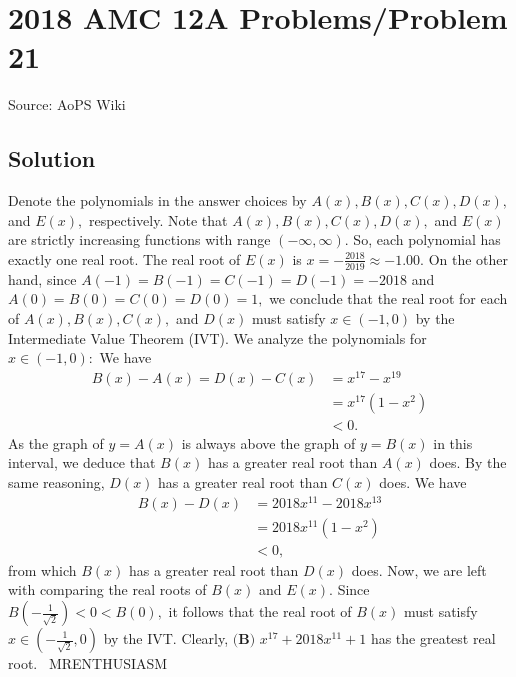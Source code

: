 \documentclass[12pt]{article}
\begin{document}
\section*{{2018 AMC 12A Problems/Problem 21}}
Source: AoPS Wiki

\subsection*{Solution}
Denote the polynomials in the answer choices by $A(x),B(x),C(x),D(x),$ and $E(x),$ respectively. Note that $A(x),B(x),C(x),D(x),$ and $E(x)$ are strictly increasing functions with range $(-\infty,\infty).$ So, each polynomial has exactly one real root. The real root of $E(x)$ is $x=-\frac{2018}{2019}\approx-1.00.$ On the other hand, since $A(-1)=B(-1)=C(-1)=D(-1)=-2018$ and $A(0)=B(0)=C(0)=D(0)=1,$ we conclude that the real root for each of $A(x),B(x),C(x),$ and $D(x)$ must satisfy $x\in(-1,0)$ by the Intermediate Value Theorem (IVT). We analyze the polynomials for $x\in(-1,0):$ We have \begin{align*} B(x)-A(x)=D(x)-C(x)&=x^{17}-x^{19} \\ &=x^{17}\left(1-x^2\right) \\ &<0. \end{align*} As the graph of $y=A(x)$ is always above the graph of $y=B(x)$ in this interval, we deduce that $B(x)$ has a greater real root than $A(x)$ does. By the same reasoning, $D(x)$ has a greater real root than $C(x)$ does. We have \begin{align*} B(x)-D(x)&=2018x^{11}-2018x^{13} \\ &=2018x^{11}\left(1-x^2\right) \\ &<0, \end{align*} from which $B(x)$ has a greater real root than $D(x)$ does. Now, we are left with comparing the real roots of $B(x)$ and $E(x).$ Since $B\left(-\frac{1}{\sqrt2}\right)<0<B(0),$ it follows that the real root of $B(x)$ must satisfy $x\in\left(-\frac{1}{\sqrt2},0\right)$ by the IVT. Clearly, $\boxed{\textbf{(B) } x^{17}+2018x^{11}+1}$ has the greatest real root. ~MRENTHUSIASM
\end{document}
